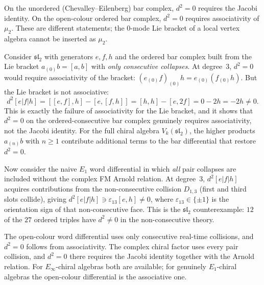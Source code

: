 \begin{remark}
\label{rem:jacobi-not-needed}
On the unordered (Chevalley--Eilenberg) bar complex, $d^2=0$
requires the Jacobi identity.  On the open-colour ordered bar complex,
\(d^2=0\) requires associativity of \(\mu_2\).  These are different
statements; the \(0\)-mode Lie bracket of a local vertex algebra cannot
be inserted as \(\mu_2\).

Consider $\mathfrak{sl}_2$ with generators $e,f,h$
and the ordered bar complex built from the Lie bracket
$a_{(0)}b=[a,b]$ with \emph{only consecutive
collapses}. At degree~$3$,
$d^2=0$ would require associativity of the bracket:
$(e_{(0)}f)_{(0)}h=e_{(0)}(f_{(0)}h)$. But the Lie bracket
is not associative:
\[
 d^2[e|f|h]
 =[[e,f],h]-[e,[f,h]]
 =[h,h]-[e,2f]
 =0-2h
 =-2h\ne 0.
\]
This is exactly the failure of associativity for the Lie
bracket, and it shows that $d^2=0$ on the ordered-consecutive
bar complex genuinely requires associativity, not the Jacobi
identity. For the full chiral algebra $V_k(\mathfrak{sl}_2)$,
the higher products $a_{(n)}b$ with $n\ge 1$ contribute
additional terms to the bar differential that restore $d^2=0$.

Now consider the naive $E_1$ word differential in which \emph{all}
pair collapses are included without the complex FM Arnold relation.
At degree~$3$, $d^2[e|f|h]$ acquires
contributions from the non-consecutive collision $D_{1,3}$
(first and third slots collide), giving
$d^2[e|f|h]\ni\varepsilon_{13}[e,h]\ne 0$, where
\(\varepsilon_{13}\in\{\pm1\}\) is the orientation sign of that
non-consecutive face. This is the
$\mathfrak{sl}_2$ counterexample: $12$ of the $27$
ordered triples have $d^2\ne 0$ in the non-consecutive
theory.

The open-colour word differential uses only consecutive real-time
collisions, and $d^2=0$ follows from associativity. The complex chiral
factor uses every pair collision, and $d^2=0$ there requires the Jacobi
identity together with the Arnold relation. For $E_\infty$-chiral
algebras both are available; for genuinely $E_1$-chiral algebras the
open-colour differential is the associative one.
\end{remark}

